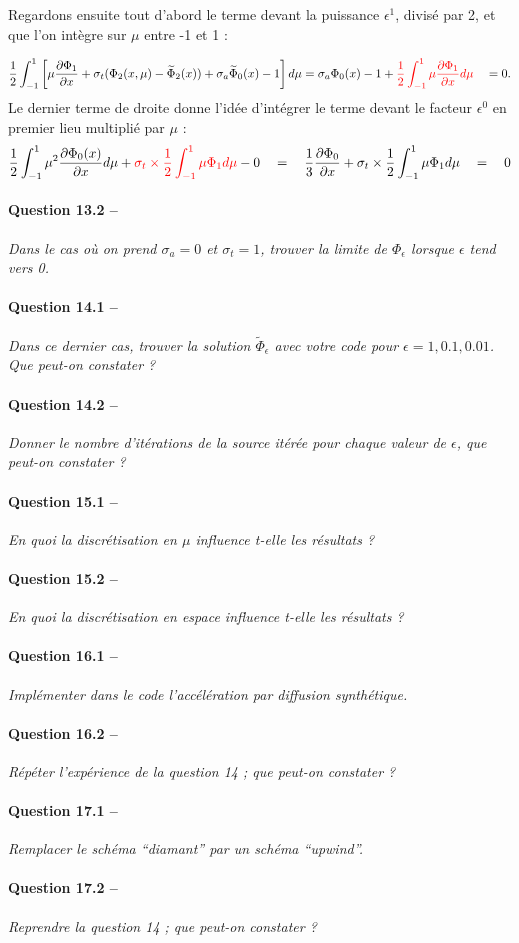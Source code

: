 \documentclass[11pt,a4paper]{article}
\newcommand{\dx}[1]{\dfrac{\partial #1}{\partial x}}
\newcommand{\question}[2]{\paragraph{Question #1 --}\hspace{-7pt}\textit{#2} \\}
\newcommand{\Phit}{\widetilde{\Phi}}
\begin{document}
Regardons ensuite tout d'abord le terme devant la puissance $\epsilon^1$, divisé par 2, et que l'on intègre sur $\mu$ entre -1 et 1 :

\begin{equation}
 \frac{1}{2}\int_{-1}^1 \left[ \mu \dx{\Phi_1} + \sigma_t (\Phi_2(x,\mu) - \Phit_2(x)) + \sigma_a \Phit_0(x) -1 \right] d\mu
 = \sigma_a \Phi_0(x) -1 + \textcolor{red}{\frac{1}{2}\int_{-1}^1  \mu \dx{\Phi_1} d\mu} \quad = 0.
\end{equation}
Le dernier terme de droite donne l'idée d'intégrer le terme devant le facteur $\epsilon^0$ en premier lieu multiplié par $\mu$ :
\begin{equation}
 \frac{1}{2} \int_{-1}^1 \mu^2 \dx{\Phi_0(x)} d\mu + \textcolor{red}{\sigma_t \times \frac{1}{2}\int_{-1}^1  \mu \Phi_1 d\mu} - 0
 \quad = \quad \frac{1}{3} \dx{\Phi_0} + \sigma_t \times \frac{1}{2}\int_{-1}^1  \mu \Phi_1 d\mu
 \quad = \quad 0
\end{equation}



\question{13.2}{Dans le cas où on prend $\sigma_a = 0$ et $\sigma_t = 1$, trouver la limite de $\Phi_\epsilon$ lorsque $\epsilon$ tend vers 0.}
\question{14.1}{Dans ce dernier cas, trouver la solution $\Phit_\epsilon$ avec votre code pour $\epsilon = 1, 0.1, 0.01$. Que peut-on constater ?}
\question{14.2}{Donner le nombre d'itérations de la source itérée pour chaque valeur de $\epsilon$, que peut-on constater ?}
\question{15.1}{En quoi la discrétisation en $\mu$ influence t-elle les résultats ?}
\question{15.2}{En quoi la discrétisation en espace influence t-elle les résultats ?}
\question{16.1}{Implémenter dans le code l'accélération par diffusion synthétique.}
\question{16.2}{Répéter l'expérience de la question 14 ; que peut-on constater ?}
\question{17.1}{Remplacer le schéma ``diamant'' par un schéma ``upwind''.}
\question{17.2}{Reprendre la question 14 ; que peut-on constater ?}
 
\end{document}
